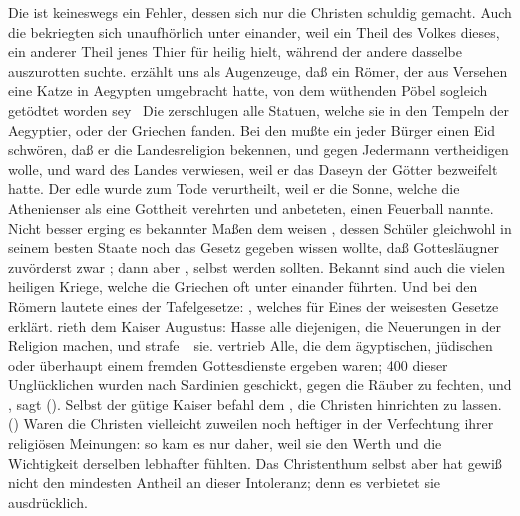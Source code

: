 \begin{aufza}
\begin{aufzb}
\item Die  ist keineswegs ein Fehler, dessen sich nur die Christen schuldig gemacht. Auch die  bekriegten sich unaufhörlich unter einander, weil ein Theil des Volkes dieses, ein anderer Theil jenes Thier für heilig hielt, während der andere dasselbe auszurotten suchte.  erzählt uns als Augenzeuge, daß ein Römer, der aus Versehen eine Katze in Aegypten umgebracht hatte, von dem wüthenden Pöbel sogleich getödtet worden sey \udgl\  Die  zerschlugen alle Statuen, welche sie in den Tempeln der Aegyptier, oder der Griechen fanden. Bei den  mußte ein jeder Bürger einen Eid schwören, daß er die Landesreligion bekennen, und gegen Jedermann vertheidigen wolle, und  ward des Landes verwiesen, weil er das Daseyn der Götter bezweifelt hatte. Der edle  wurde zum Tode verurtheilt, weil er die Sonne, welche die Athenienser als eine Gottheit verehrten und anbeteten, einen Feuerball nannte. Nicht besser erging es bekannter Maßen dem weisen , dessen Schüler  gleichwohl in seinem besten Staate noch das Gesetz gegeben wissen wollte, daß Gottesläugner zuvörderst zwar ; dann aber , selbst  werden sollten. Bekannt sind auch die vielen heiligen Kriege, welche die Griechen oft unter einander führten. Und bei den Römern lautete eines der Tafelgesetze: , welches  für Eines der weisesten Gesetze erklärt.  rieth dem Kaiser Augustus: Hasse alle diejenigen, die Neuerungen in der Religion machen, und strafe~\ sie.  vertrieb Alle, die dem ägyptischen, jüdischen oder überhaupt einem fremden Gottesdienste ergeben waren; 400 dieser Unglücklichen wurden nach Sardinien geschickt, gegen die Räuber zu fechten, und , sagt  (). Selbst der gütige Kaiser  befahl dem , die Christen hinrichten zu lassen. () Waren die Christen vielleicht zuweilen noch heftiger in der Verfechtung ihrer religiösen Meinungen: so kam es nur daher, weil sie den Werth und die Wichtigkeit derselben lebhafter fühlten. Das Christenthum selbst aber hat gewiß nicht den mindesten Antheil an dieser Intoleranz; denn es verbietet sie ausdrücklich.

\end{aufzb}
\end{aufza}
